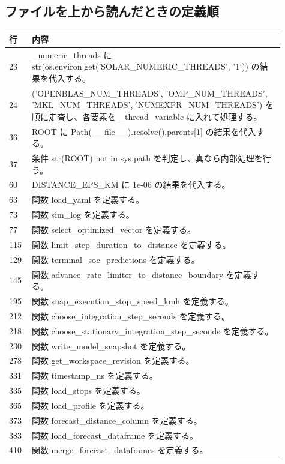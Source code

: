 \documentclass[a4paper,11pt]{article}
\begin{document}
        \subsection{ファイルを上から読んだときの定義順}
            \begin{longtable}{p{0.07\linewidth} p{0.84\linewidth}}
            \toprule
            行 & 内容 \\
            \midrule
            23 & \_numeric\_threads に str(os.environ.get('SOLAR\_NUMERIC\_THREADS', '1')) の結果を代入する。 \\
24 & ('OPENBLAS\_NUM\_THREADS', 'OMP\_NUM\_THREADS', 'MKL\_NUM\_THREADS', 'NUMEXPR\_NUM\_THREADS') を順に走査し、各要素を \_thread\_variable に入れて処理する。 \\
36 & ROOT に Path(\_\_file\_\_).resolve().parents[1] の結果を代入する。 \\
37 & 条件 str(ROOT) not in sys.path を判定し、真なら内部処理を行う。 \\
60 & DISTANCE\_EPS\_KM に 1e-06 の結果を代入する。 \\
63 & 関数 load\_yaml を定義する。 \\
73 & 関数 sim\_log を定義する。 \\
77 & 関数 select\_optimized\_vector を定義する。 \\
115 & 関数 limit\_step\_duration\_to\_distance を定義する。 \\
129 & 関数 terminal\_soc\_predictions を定義する。 \\
145 & 関数 advance\_rate\_limiter\_to\_distance\_boundary を定義する。 \\
195 & 関数 snap\_execution\_stop\_speed\_kmh を定義する。 \\
212 & 関数 choose\_integration\_step\_seconds を定義する。 \\
218 & 関数 choose\_stationary\_integration\_step\_seconds を定義する。 \\
230 & 関数 write\_model\_snapshot を定義する。 \\
278 & 関数 get\_workspace\_revision を定義する。 \\
331 & 関数 timestamp\_ns を定義する。 \\
335 & 関数 load\_stops を定義する。 \\
365 & 関数 load\_profile を定義する。 \\
373 & 関数 forecast\_distance\_column を定義する。 \\
383 & 関数 load\_forecast\_dataframe を定義する。 \\
410 & 関数 merge\_forecast\_dataframes を定義する。 \\

\end{longtable}
\end{document}
